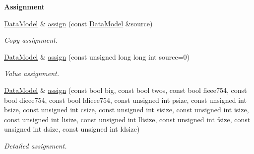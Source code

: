 \begin{Indent}{\bf Assignment}\par
\begin{DoxyCompactItemize}
\item 
\hyperlink{exceptionmagrathea_1_1DataModel}{Data\-Model} \& \hyperlink{exceptionmagrathea_1_1DataModel_a21712d7526ced1fe1798c322abe68700}{assign} (const \hyperlink{exceptionmagrathea_1_1DataModel}{Data\-Model} \&source)
\begin{DoxyCompactList}\small\item\em Copy assignment. \end{DoxyCompactList}\item 
\hyperlink{exceptionmagrathea_1_1DataModel}{Data\-Model} \& \hyperlink{exceptionmagrathea_1_1DataModel_a24cec68e6e74ef2416f9b43f4b3f7391}{assign} (const unsigned long long int source=0)
\begin{DoxyCompactList}\small\item\em Value assignment. \end{DoxyCompactList}\item 
\hyperlink{exceptionmagrathea_1_1DataModel}{Data\-Model} \& \hyperlink{exceptionmagrathea_1_1DataModel_afffe5054115091f2670e3f00f903333e}{assign} (const bool big, const bool twos, const bool fieee754, const bool dieee754, const bool ldieee754, const unsigned int psize, const unsigned int bsize, const unsigned int csize, const unsigned int sisize, const unsigned int isize, const unsigned int lisize, const unsigned int llisize, const unsigned int fsize, const unsigned int dsize, const unsigned int ldsize)
\begin{DoxyCompactList}\small\item\em Detailed assignment. \end{DoxyCompactList}\end{DoxyCompactItemize}
\end{Indent}
